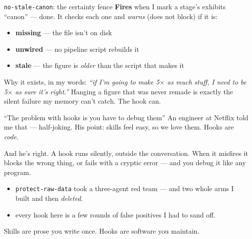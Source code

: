 \documentclass[aspectratio=169,11pt]{beamer}
\begin{document}
\begin{frame}{\texttt{no-stale-canon}: the certainty fence}
\textbf{Fires} when I mark a stage's exhibits ``canon'' --- done. It checks each one and \emph{warns} (does not block) if it is:
\vspace{0.25cm}
\begin{itemize}\setlength\itemsep{0.22em}
    \item \textbf{missing} --- the file isn't on disk
    \item \textbf{unwired} --- no pipeline script rebuilds it
    \item \textbf{stale} --- the figure is \emph{older} than the script that makes it
\end{itemize}
\vspace{0.2cm}
Why it exists, in my words: \emph{``if I'm going to make 5$\times$ as much stuff, I need to be 5$\times$ as sure it's right.''}
\vspace{0.1cm}
\alert{Hanging a figure that was never remade is exactly the silent failure my memory can't catch. The hook can.}
\end{frame}

\begin{frame}{``The problem with hooks is you have to debug them''}
An engineer at Netflix told me that --- half-joking. His point: skills feel easy, so we love them. Hooks are \emph{code}.
\vspace{0.3cm}

And he's right. A hook runs silently, outside the conversation. When it misfires it blocks the wrong thing, or fails with a cryptic error --- and you debug it like any program.
\vspace{0.25cm}
\begin{itemize}\setlength\itemsep{0.22em}
    \item \texttt{protect-raw-data} took a three-agent red team --- and two whole arms I built and then \emph{deleted}.
    \item every hook here is a few rounds of false positives I had to sand off.
\end{itemize}
\vspace{0.05cm}
\alert{Skills are prose you write once. Hooks are software you maintain.}
\end{frame}
\end{document}
